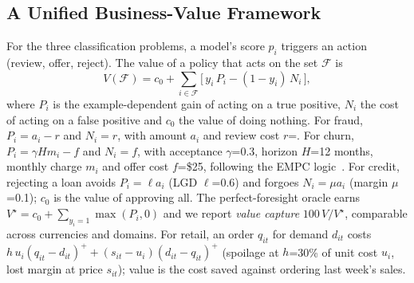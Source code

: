 \documentclass[conference]{IEEEtran}
\begin{document}
\subsection{A Unified Business-Value Framework}
For the three classification problems, a model's score $p_i$ triggers an action (review, offer, reject). The value of a
policy that acts on the set $\mathcal{F}$ is
\begin{equation}
V(\mathcal{F}) = c_0 + \sum_{i\in\mathcal{F}} \big[\, y_i\,P_i - (1-y_i)\,N_i \,\big],
\label{eq:value}
\end{equation}
where $P_i$ is the example-dependent gain of acting on a true positive, $N_i$ the cost of acting on a false positive and
$c_0$ the value of doing nothing. For fraud, $P_i = a_i - r$ and $N_i = r$, with amount $a_i$ and review cost
$r$=. For churn, $P_i = \gamma H m_i - f$ and $N_i = f$, with acceptance $\gamma$=0.3, horizon $H$=12 months,
monthly charge $m_i$ and offer cost $f$=\$25, following the EMPC logic~\cite{verbraken2013}. For credit, rejecting a loan avoids
$P_i=\ell a_i$ (LGD $\ell$=0.6) and forgoes $N_i = \mu a_i$ (margin $\mu$=0.1); $c_0$ is the value of approving all. The
perfect-foresight oracle earns $V^\star = c_0 + \sum_{y_i=1}\max(P_i,0)$ and we report \emph{value capture}
$100\,V/V^\star$, comparable across currencies and domains. For retail, an order $q_{it}$ for demand $d_{it}$
costs $h\,u_i(q_{it}{-}d_{it})^+ + (s_{it}{-}u_i)(d_{it}{-}q_{it})^+$ (spoilage at $h$=30\% of unit cost $u_i$, lost
margin at price $s_{it}$); value is the cost saved against ordering last week's sales.
\end{document}
